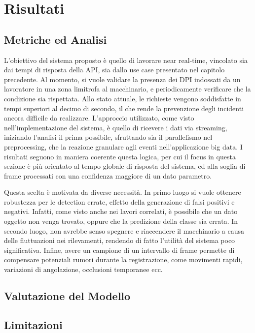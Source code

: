 \chapter{Risultati}

\section{Metriche ed Analisi}
L'obiettivo del sistema proposto è quello di lavorare near real-time, vincolato sia dai tempi di risposta della API, sia dallo use case presentato nel capitolo precedente. Al momento, si vuole validare la presenza dei DPI indossati da un lavoratore in una zona limitrofa al macchinario, e periodicamente verificare che la condizione sia rispettata. Allo stato attuale, le richieste vengono soddisfatte in tempi superiori al decimo di secondo, il che rende la prevenzione degli incidenti ancora difficile da realizzare. L'approccio utilizzato, come visto nell'implementazione del sistema, è quello di ricevere i dati via streaming, iniziando l'analisi il prima possibile, sfruttando sia il parallelismo nel preprocessing, che la reazione granulare agli eventi nell'applicazione big data. I risultati seguono in maniera coerente questa logica, per cui il focus in questa sezione è più orientato al tempo globale di risposta del sistema, ed alla soglia di frame processati con una confidenza maggiore di un dato parametro. 



Questa scelta è motivata da diverse necessità. In primo luogo si vuole ottenere robustezza per le detection errate, effetto della generazione di falsi positivi e negativi. Infatti, come visto anche nei lavori correlati, è possibile che un dato oggetto non venga trovato, oppure che la predizione della classe sia errata. In secondo luogo, non avrebbe senso spegnere e riaccendere il macchinario a causa delle fluttuazioni nei rilevamenti, rendendo di fatto l'utilità del sistema poco significativa. Infine, avere un campione di un intervallo di frame permette di compensare potenziali rumori durante la registrazione, come movimenti rapidi, variazioni di angolazione, occlusioni temporanee ecc. 

\section{Valutazione del Modello}
\section{Limitazioni}
